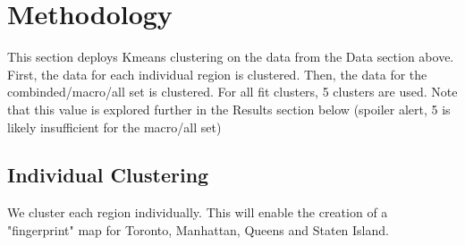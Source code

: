 \documentclass[11pt]{article}
\begin{document}
    

    \section{Methodology}\label{methodology}

This section deploys Kmeans clustering on the data from the Data section
above. First, the data for each individual region is clustered. Then,
the data for the combinded/macro/all set is clustered. For all fit
clusters, 5 clusters are used. Note that this value is explored further
in the Results section below (spoiler alert, 5 is likely insufficient
for the macro/all set)

    \subsection{Individual Clustering}\label{individual-clustering}

We cluster each region individually. This will enable the creation of a
"fingerprint" map for Toronto, Manhattan, Queens and Staten Island.
\end{document}
